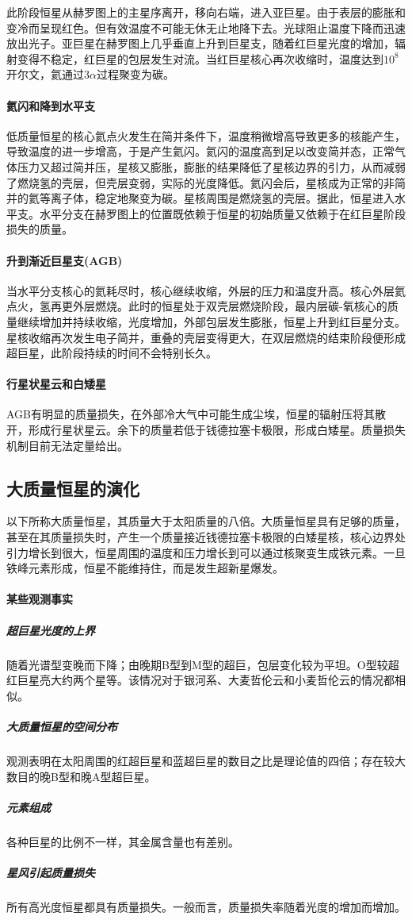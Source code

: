 此阶段恒星从赫罗图上的主星序离开，移向右端，进入亚巨星。由于表层的膨胀和变冷而呈现红色。但有效温度不可能无休无止地降下去。光球阻止温度下降而迅速放出光子。亚巨星在赫罗图上几乎垂直上升到巨星支，随着红巨星光度的增加，辐射变得不稳定，红巨星的包层发生对流。当红巨星核心再次收缩时，温度达到$10^8$开尔文，氦通过3$\alpha$过程聚变为碳。
\paragraph{氦闪和降到水平支}低质量恒星的核心氦点火发生在简并条件下，温度稍微增高导致更多的核能产生，导致温度的进一步增高，于是产生氦闪。氦闪的温度高到足以改变简并态，正常气体压力又超过简并压，星核又膨胀，膨胀的结果降低了星核边界的引力，从而减弱了燃烧氢的壳层，但壳层变弱，实际的光度降低。氦闪会后，星核成为正常的非简并的氦等离子体，稳定地聚变为碳。星核周围是燃烧氢的壳层。据此，恒星进入水平支。水平分支在赫罗图上的位置既依赖于恒星的初始质量又依赖于在红巨星阶段损失的质量。
\paragraph{升到渐近巨星支(AGB)}当水平分支核心的氦耗尽时，核心继续收缩，外层的压力和温度升高。核心外层氦点火，氢再更外层燃烧。此时的恒星处于双壳层燃烧阶段，最内层碳-氧核心的质量继续增加并持续收缩，光度增加，外部包层发生膨胀，恒星上升到红巨星分支。星核收缩再次发生电子简并，重叠的壳层变得更大，在双层燃烧的结束阶段便形成超巨星，此阶段持续的时间不会特别长久。
\paragraph{行星状星云和白矮星}AGB有明显的质量损失，在外部冷大气中可能生成尘埃，恒星的辐射压将其散开，形成行星状星云。余下的质量若低于钱德拉塞卡极限，形成白矮星。质量损失机制目前无法定量给出。
\subsection{大质量恒星的演化}以下所称大质量恒星，其质量大于太阳质量的八倍。大质量恒星具有足够的质量，甚至在其质量损失时，产生一个质量接近钱德拉塞卡极限的白矮星核，核心边界处引力增长到很大，恒星周围的温度和压力增长到可以通过核聚变生成铁元素。一旦铁峰元素形成，恒星不能维持住，而是发生超新星爆发。
\paragraph{某些观测事实}
\subparagraph{超巨星光度的上界}随着光谱型变晚而下降；由晚期B型到M型的超巨，包层变化较为平坦。O型较超红巨星亮大约两个星等。该情况对于银河系、大麦哲伦云和小麦哲伦云的情况都相似。
\subparagraph{大质量恒星的空间分布}观测表明在太阳周围的红超巨星和蓝超巨星的数目之比是理论值的四倍；存在较大数目的晚B型和晚A型超巨星。
\subparagraph{元素组成}各种巨星的比例不一样，其金属含量也有差别。
\subparagraph{星风引起质量损失}所有高光度恒星都具有质量损失。一般而言，质量损失率随着光度的增加而增加。
